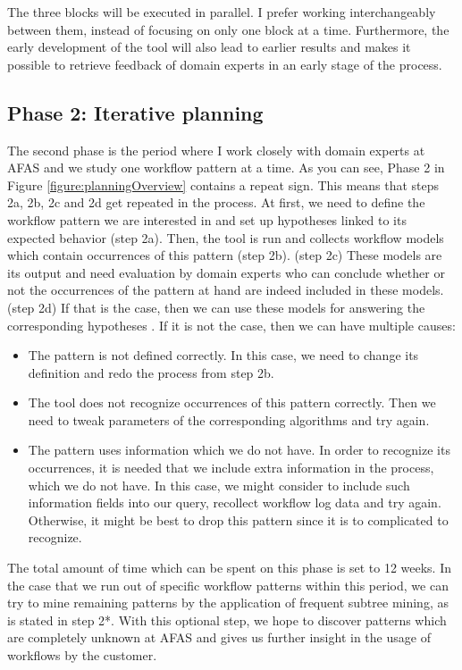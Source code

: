 \documentclass[a4paper,11pt]{article}
\begin{document}
The three blocks will be executed in parallel. I prefer working interchangeably between them, instead of focusing on only one block at a time. Furthermore, the early development of the tool will also lead to earlier results and makes it possible to retrieve feedback of domain experts in an early stage of the process.

\subsection{Phase 2: Iterative planning}
The second phase is the period where I work closely with domain experts at AFAS and we study one workflow pattern at a time. As you can see, Phase 2 in Figure \ref{figure:planningOverview} contains a repeat sign. This means that steps 2a, 2b, 2c and 2d get repeated in the process. At first, we need to define the workflow pattern we are interested in and set up hypotheses linked to its expected behavior (step 2a). Then, the tool is run and collects workflow models which contain occurrences of this pattern (step 2b). (step 2c) These models are its output and need evaluation by domain experts who can conclude whether or not the occurrences of the pattern at hand are indeed included in these models. (step 2d) If that is the case, then we can use these models for answering the corresponding hypotheses . If it is not the case, then we can have multiple causes:
\begin{itemize}
\item The pattern is not defined correctly. In this case, we need to change its definition and redo the process from step 2b.
\item The tool does not recognize occurrences of this pattern correctly. Then we need to tweak parameters of the corresponding algorithms and try again.
\item The pattern uses information which we do not have. In order to recognize its occurrences, it is needed that we include extra information in the process, which we do not have. In this case, we might consider to include such information fields into our query, recollect workflow log data and try again. Otherwise, it might be best to drop this pattern since it is to complicated to recognize.
\end{itemize}

The total amount of time which can be spent on this phase is set to 12 weeks. In the case that we run out of specific workflow patterns within this period, we can try to mine remaining patterns by the application of frequent subtree mining, as is stated in step 2*. With this optional step, we hope to discover patterns which are completely unknown at AFAS and gives us further insight in the usage of workflows by the customer.
\end{document}

